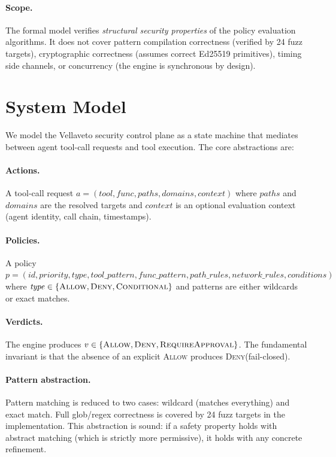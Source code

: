 \documentclass[sigplan,screen,nonacm]{acmart}
\newcommand{\vellaveto}{Vellaveto\xspace}
\newcommand{\deny}{\textsc{Deny}\xspace}
\newcommand{\allow}{\textsc{Allow}\xspace}
\begin{document}
\paragraph{Scope.} The formal model verifies \emph{structural security
properties} of the policy evaluation algorithms. It does not cover pattern
compilation correctness (verified by 24 fuzz targets), cryptographic
correctness (assumes correct Ed25519 primitives), timing side channels,
or concurrency (the engine is synchronous by design).


\section{System Model}
\label{sec:model}

We model the \vellaveto security control plane as a state machine that
mediates between agent tool-call requests and tool execution. The core
abstractions are:

\paragraph{Actions.} A tool-call request $a = (\mathit{tool}, \mathit{func},
\mathit{paths}, \mathit{domains}, \mathit{context})$ where $\mathit{paths}$
and $\mathit{domains}$ are the resolved targets and $\mathit{context}$ is an
optional evaluation context (agent identity, call chain, timestamps).

\paragraph{Policies.} A policy $p = (\mathit{id}, \mathit{priority},
\mathit{type}, \mathit{tool\_pattern}, \mathit{func\_pattern},
\mathit{path\_rules}, \mathit{network\_rules}, \mathit{conditions})$ where
$\mathit{type} \in \{\allow, \deny, \textsc{Conditional}\}$ and patterns
are either wildcards or exact matches.

\paragraph{Verdicts.} The engine produces $v \in \{\allow, \deny,
\textsc{RequireApproval}\}$. The fundamental invariant is that the absence
of an explicit \allow produces \deny (fail-closed).

\paragraph{Pattern abstraction.} Pattern matching is reduced to two cases:
wildcard (matches everything) and exact match. Full glob/regex correctness is
covered by 24 fuzz targets in the implementation. This abstraction is sound:
if a safety property holds with abstract matching (which is strictly more
permissive), it holds with any concrete refinement.
\end{document}
